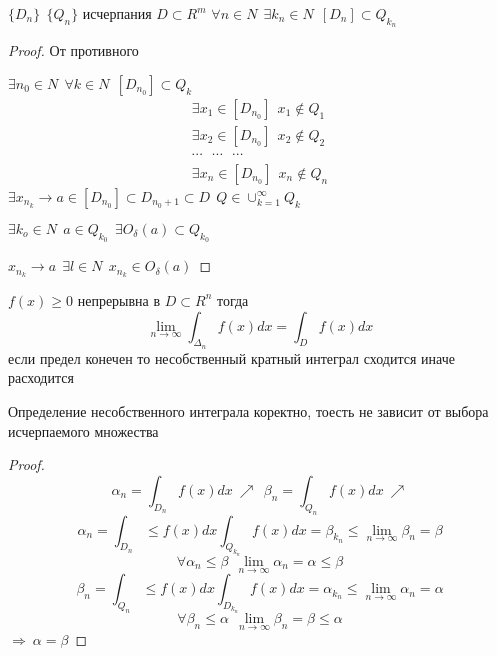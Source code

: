 \begin{theorem}
  $\{D_n\} ~~ \{Q_n\}$ исчерпания $D \subset R^m$ $\forall n \in N ~~
  \exists k_n \in N ~~ [D_n] \subset Q_{k_n}$
\end{theorem}

\begin{proof}
  От противного

  $\exists n_0 \in N ~~ \forall k \in N ~~ [D_{n_0}] \subset Q_k$
  $$
  \begin{array}{c}
    \exists x_1 \in [D_{n_0}] ~~ x_1 \not\in Q_1 \\
    \exists x_2 \in [D_{n_0}] ~~ x_2 \not\in Q_2 \\
    \cdots ~~~ \cdots ~~~ \cdots \\
    \exists x_n \in [D_{n_0}] ~~ x_n \not\in Q_n
  \end{array}
  $$
  $\exists x_{n_k} \to a \in [D_{n_0}] \subset D_{n_0+1} \subset D ~~
  Q \in \cup_{k=1}^{\infty} Q_k$

  $\exists k_o \in N ~~ a \in Q_{k_0} ~~ \exists O_{\delta}(a) \subset Q_{k_0}$

  $x_{n_k} \to a ~~ \exists l \in N ~~ x_{n_k} \in O_{\delta}(a)$
\end{proof}

\begin{theorem}
  $f(x) \ge 0$ непрерывна в $D \subset R^n$ тогда
  $$
  \lim_{n \to \infty} \int_{\Delta_n} f(x) dx = \int_D f(x) dx
  $$
  если предел конечен то несобственный кратный интеграл сходится иначе
  расходится
\end{theorem}

\begin{theorem}
  Определение несобственного интеграла коректно, тоесть не зависит от выбора
  исчерпаемого множества
\end{theorem}

\begin{proof}
  $$
  \alpha_n = \int_{D_n} f(x) dx ~ \nearrow ~~ \beta_n = \int_{Q_n} f(x) dx ~
  \nearrow
  $$
  $$
  \alpha_n = \int_{D_n} \le f(x) dx \int_{Q_{k_n}} f(x) dx = \beta_{k_n} \le
  \lim_{n \to \infty} \beta_n = \beta
  $$
  $$
  \forall \alpha_n \le \beta ~~ \lim_{n \to \infty} \alpha_n = \alpha \le \beta
  $$
  $$
  \beta_n = \int_{Q_n} \le f(x) dx \int_{D_{k_n}} f(x) dx = \alpha_{k_n} \le
  \lim_{n \to \infty} \alpha_n = \alpha
  $$
  $$
  \forall \beta_n \le \alpha ~~ \lim_{n \to \infty} \beta_n = \beta \le \alpha
  $$
  $\Rightarrow ~ \alpha = \beta$
\end{proof}

